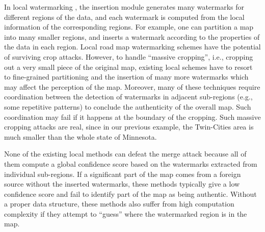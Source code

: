 In local watermarking \cite{OhbuchiUE02,OhbuchiUE03,Vogit:2003}, 
the insertion module generates many watermarks
for different regions of the data, and each watermark is computed from the
local information of the corresponding regions. For example,  
one can partition a map into many smaller regions,
and inserts a watermark according to the properties of 
the data in each region.
Local road map watermarking schemes \cite{OhbuchiUE02,OhbuchiUE03,Vogit:2003} have 
the potential of surviving crop attacks. However, to handle
``massive cropping'', i.e., cropping out a very small piece of the original map,
existing local schemes have to resort to fine-grained partitioning and
the insertion of many more watermarks which may affect the perception of the 
map. Moreover, many of these techniques
require coordination between the detection of watermarks in
adjacent sub-regions (e.g., some repetitive patterns) to conclude the 
authenticity of the overall map. Such coordination may fail if it happens
at the boundary of the cropping.
Such massive cropping attacks are real, since
in our previous example, the Twin-Cities area is much smaller than the whole
state of Minnesota. 

None of the existing local methods can defeat the merge attack because
all of them compute a global confidence score based on the watermarks
extracted from individual sub-regions. If a significant part of the map
comes from a foreign source without the inserted watermarks, these
methods typically give a low confidence score and fail to identify
part of the map as being authentic. Without a proper data structure,
these methods also suffer from high computation complexity if they attempt 
to ``guess'' where the watermarked region is in the map.

%

